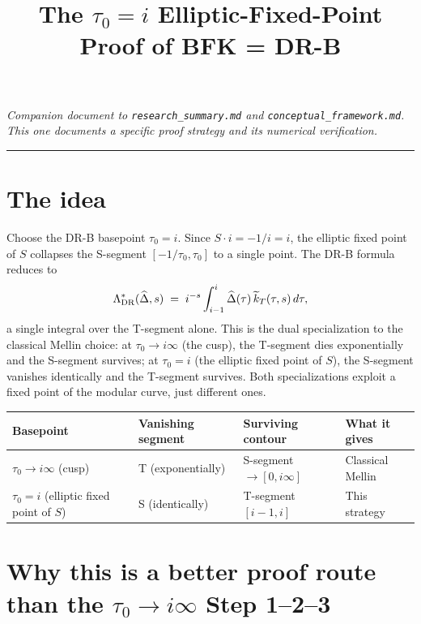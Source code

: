\documentclass[11pt]{article}
\title{The $\tau_0 = i$ Elliptic-Fixed-Point Proof of BFK = DR-B}
\author{}
\date{}
\newcommand{\hatDelta}{\widehat{\Delta}}
\begin{document}
\maketitle

\begin{center}
\emph{Companion document to \texttt{research\_summary.md} and \texttt{conceptual\_framework.md}.\\ This one documents a specific proof strategy and its numerical verification.}
\end{center}

\vspace{1em}
\hrule
\vspace{1em}

\section{The idea}

Choose the DR-B basepoint $\tau_0 = i$. Since $S \cdot i = -1/i = i$, the elliptic fixed point of $S$ collapses the S-segment $[-1/\tau_0, \tau_0]$ to a single point. The DR-B formula reduces to
\[
\Lambda^*_{\rm DR}(\hatDelta, s) \;=\; i^{-s}\int_{i-1}^{i} \hatDelta(\tau)\, \widetilde{k}_T(\tau, s)\, d\tau,
\]
a single integral over the T-segment alone. This is the dual specialization to the classical Mellin choice: at $\tau_0 \to i\infty$ (the cusp), the T-segment dies exponentially and the S-segment survives; at $\tau_0 = i$ (the elliptic fixed point of $S$), the S-segment vanishes identically and the T-segment survives. Both specializations exploit a fixed point of the modular curve, just different ones.

\begin{center}
\begin{tabular}{lll>{\raggedright\arraybackslash}p{4.5cm}}
\toprule
Basepoint & Vanishing segment & Surviving contour & What it gives \\
\midrule
$\tau_0 \to i\infty$ (cusp) & T (exponentially) & S-segment $\to [0, i\infty]$ & Classical Mellin \\
$\tau_0 = i$ (elliptic fixed point of $S$) & S (identically) & T-segment $[i-1, i]$ & This strategy \\
\bottomrule
\end{tabular}
\end{center}

\section{Why this is a better proof route than the $\tau_0 \to i\infty$ Step 1--2--3}
\end{document}

